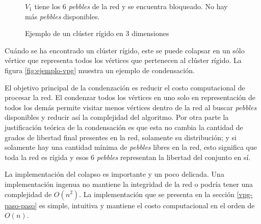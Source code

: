 \begin{figure}
\centering
{}
\caption{Ejemplo de un clúster rígido en 3 dimensiones}{$V_1$ tiene los 6 \emph{pebbles} de la red y se encuentra bloqueado. No hay más \emph{pebbles} disponibles.}
\label{fig:cluster-rigido}
\end{figure}

Cuándo se ha encontrado un clúster rígido, este se puede colapsar en un sólo vértice que representa todos los vértices que pertenecen al clúster rígido. La figura \ref{fig:ejemplo-vpg} muestra un ejemplo de condensación.

El objetivo principal de la condenzación es reducir el costo computacional de procesar la red. El condenzar todos los vértices en uno solo en representación de todos los demás permite visitar menos vértices dentro de la red al buscar \emph{pebbles} disponibles y reducir así la complejidad del algoritmo. Por otra parte la justificación teórica de la condensación es que esta no cambia la cantidad de grados de libertad final presentes en la red, solamente su distribución; y si solamente hay una cantidad mínima de \emph{pebbles} libres en la red, esto significa que toda la red es rígida y esos 6 \emph{pebbles} representan la libertad del conjunto en sí.

La implementación del colapso es importante y un poco delicada. Una implementación ingenua no mantiene la integridad de la red o podría tener una complejidad de $O(n^2)$. La implementación que se presenta en la sección \ref{vpg-paso-paso} es simple, intuitiva y mantiene el costo computacional en el orden de $O(n)$.


